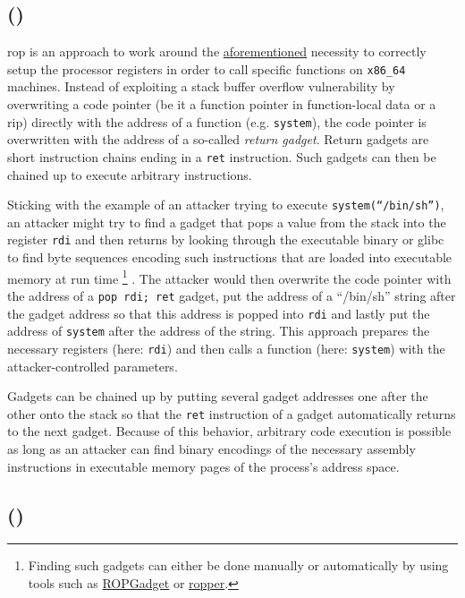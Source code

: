 \subsection{ ()}
\label{subsec:cr-rop}

\gls{rop} is an approach to work around the \hyperref[subsec:cr-ret2libc]{aforementioned} necessity to correctly setup the processor registers in order to call specific functions on \texttt{x86\_64} machines.
Instead of exploiting a stack buffer overflow vulnerability by overwriting a code pointer (be it a function pointer in function-local data or a \gls{rip}) directly with the address of a function (e.g. \texttt{system}), the code pointer is overwritten with the address of a so-called \emph{return gadget}.
Return gadgets are short instruction chains ending in a \texttt{ret} instruction.
Such gadgets can then be chained up to execute arbitrary instructions.

Sticking with the example of an attacker trying to execute \texttt{system(``/bin/sh'')}, an attacker might try to find a gadget that pops a value from the stack into the register \texttt{rdi} and then returns by looking through the executable binary or \gls{glibc} to find byte sequences encoding such instructions that are loaded into executable memory at run time%
	\footnote{Finding such gadgets can either be done manually or automatically by using tools such as \href{https://github.com/JonathanSalwan/ROPgadget}{ROPGadget} or \href{https://github.com/sashs/Ropper}{ropper}.}%
.
The attacker would then overwrite the code pointer with the address of a \texttt{pop rdi; ret} gadget, put the address of a ``/bin/sh'' string after the gadget address so that this address is popped into \texttt{rdi} and lastly put the address of \texttt{system} after the address of the string.
This approach prepares the necessary registers (here: \texttt{rdi}) and then calls a function (here: \texttt{system}) with the attacker-controlled parameters.

Gadgets can be chained up by putting several gadget addresses one after the other onto the stack so that the \texttt{ret} instruction of a gadget automatically returns to the next gadget.
Because of this behavior, arbitrary code execution is possible as long as an attacker can find binary encodings of the necessary assembly instructions in executable memory pages of the process's address space.

\subsection{ ()}
\label{subsec:cr-jop}

